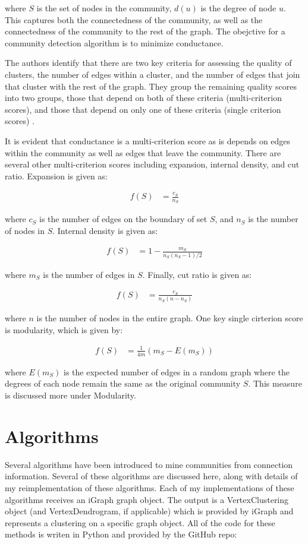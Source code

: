 \documentclass{article}
\begin{document}
where $S$ is the set of nodes in the community, $d(u)$ is the degree of node $u$. This captures both the connectedness of the community, as well as the connectedness of the community to the rest of the graph. The obejctive for a community detection algorithm is to minimize conductance.
\par
The authors identify that there are two key criteria for assessing the quality of clusters, the number of edges within a cluster, and the number of edges that join that cluster with the rest of the graph. They group the remaining quality scores into two groups, those that depend on both of these criteria (multi-criterion scores), and those that depend on only one of these criteria (single criterion scores) \cite{Leskovec:2010:ECA:1772690.1772755}.
\par
It is evident that conductance is a multi-criterion score as is depends on edges within the community as well as edges that leave the community. There are several other multi-criterion scores including expansion, internal density, and cut ratio. Expansion is given as:

\begin{align}
    f(S) &= \frac{c_S}{n_S}
\end{align}

where $c_S$ is the number of edges on the boundary of set $S$, and $n_S$ is the number of nodes in $S$. Internal density is given as:

\begin{align}
    f(S) &= 1 - \frac{m_S}{n_S(n_S - 1)/2}
\end{align}

where $m_S$ is the number of edges in $S$. Finally, cut ratio is given as:

\begin{align}
    f(S) &= \frac{c_S}{n_S(n - n_S)}
\end{align}

where $n$ is the number of nodes in the entire graph. One key single cirterion score is modularity, which is given by:

\begin{align}
    f(S) &= \frac{1}{4m}(m_S - E(m_S))
\end{align}

where $E(m_S)$ is the expected number of edges in a random graph where the degrees of each node remain the same as the original community $S$. This measure is discussed more under Modularity.

\section{Algorithms}
Several algorithms have been introduced to mine communities from connection information. Several of these algorithms are discussed here, along with details of my reimplementation of these algorithms. Each of my implementations of these algorithms receives an iGraph graph object. The output is a VertexClustering object (and VertexDendrogram, if applicable) which is provided by iGraph and represents a clustering on a specific graph object. All of the code for these methods is writen in Python and provided by the GitHub repo:
\end{document}
